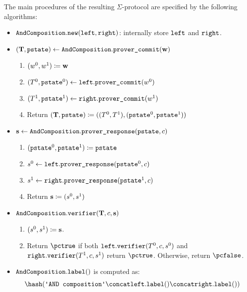 \documentclass[11pt]{article}
\begin{document}
The main procedures of the resulting $\Sigma$-protocol are specified by the following algorithms:
\begin{itemize}
  \item
  $\texttt{AndComposition}.\texttt{new}(\texttt{left}, \texttt{right})$: internally store $\texttt{left}$ and $\texttt{right}$.
  \item
  $(\mathbf {T}, \texttt{pstate})\gets \texttt{AndComposition}.\texttt{prover\_commit}(\mathbf {w})$
    \begin{enumerate}
      \item
        $(w^0,w^1)\coloneqq \mathbf {w}$
      \item
        $(T^0,\texttt{pstate}^0)\gets\texttt{left}.\texttt{prover\_commit}(w^0)$
      \item $(T^1,\texttt{pstate}^1)\gets\texttt{right}.\texttt{prover\_commit}(w^1)$
      \item
	Return $(\mathbf {T},\texttt{pstate}) \coloneqq ((T^0,  T^1),(\texttt{pstate}^0,\texttt{pstate}^1))$
    \end{enumerate}
  \item
  $\mathbf {s} \gets \texttt{AndComposition}.\texttt{prover\_response}(\texttt{pstate}, c)$
  \begin{enumerate}
      \item
	    $(\texttt{pstate}^0,\texttt{pstate}^1)\coloneqq \texttt{pstate}$
      \item
      $s^0\gets\texttt{left}.\texttt{prover\_response}(\texttt{pstate}^0, c)$
      \item
      $s^1\gets\texttt{right}.\texttt{prover\_response}(\texttt{pstate}^1, c)$
      \item
      Return $\mathbf {s}\coloneqq(s^0,s^1)$
    \end{enumerate}
  \item
  $\texttt{AndComposition}.\texttt{verifier}(\mathbf {T}, c, \mathbf {s})$
  \begin{enumerate}
      \item
        $(s^0,s^1)\coloneqq \mathbf {s}$.
      \item
	Return $\accept$ if both $\texttt{left}.\texttt{verifier}(T^0,c, s^0)$ and $\texttt{right}.\texttt{verifier}(T^1,c, s^1)$ return $\accept$. Otherwise, return $\reject$.
    \end{enumerate}
  \item  $\texttt{AndComposition}.\texttt{label}()$ is computed as:
    \[
     \hash(\andlabel \concat \leftbranch.\labeltt() \concat \rightbranch.\labeltt())
\]
\end{itemize}
\end{document}
